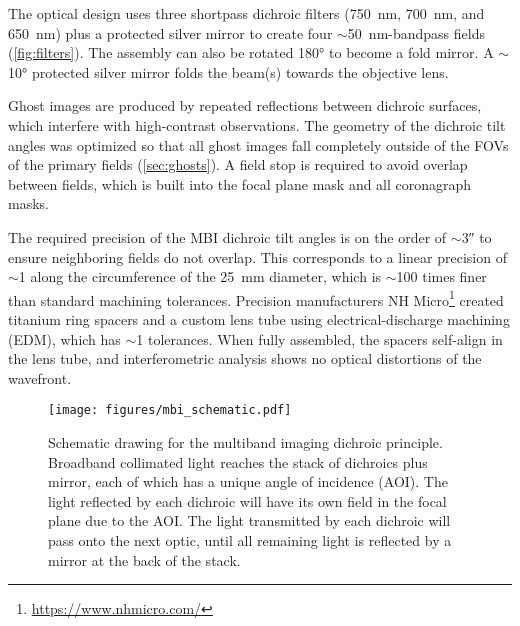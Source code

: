 The optical design uses three shortpass dichroic filters (\SI{750}{\nano\meter}, \SI{700}{\nano\meter}, and \SI{650}{\nano\meter}) plus a protected silver mirror to create four $\sim$\SI{50}{\nano\meter}-bandpass fields (\autoref{fig:filters}). The assembly can also be rotated \ang{180} to become a fold mirror. A $\sim$\ang{10} protected silver mirror folds the beam(s) towards the objective lens.

Ghost images are produced by repeated reflections between dichroic surfaces, which interfere with high-contrast observations. The geometry of the dichroic tilt angles was optimized so that all ghost images fall completely outside of the FOVs of the primary fields (\autoref{sec:ghosts}). A field stop is required to avoid overlap between fields, which is built into the focal plane mask and all coronagraph masks. 

The required precision of the MBI dichroic tilt angles is on the order of $\sim$\ang{;;3} to ensure neighboring fields do not overlap. This corresponds to a linear precision of $\sim$\SI{1}{\micron} along the circumference of the \SI{25}{\milli\meter} diameter, which is $\sim$100 times finer than standard machining tolerances. Precision manufacturers NH Micro\footnote{\url{https://www.nhmicro.com/}} created titanium ring spacers and a custom lens tube using electrical-discharge machining (EDM), which has $\sim$\SI{1}{\micron} tolerances. When fully assembled, the spacers self-align in the lens tube, and interferometric analysis shows no optical distortions of the wavefront. 

\begin{figure}
    \centering
    \texttt{[image: figures/mbi\_schematic.pdf]}
    \caption{Schematic drawing for the multiband imaging dichroic principle. Broadband collimated light reaches the stack of dichroics plus mirror, each of which has a unique angle of incidence (AOI). The light reflected by each dichroic will have its own field in the focal plane due to the AOI. The light transmitted by each dichroic will pass onto the next optic, until all remaining light is reflected by a mirror at the back of the stack.\label{fig:mbi_schematic}}
\end{figure}


